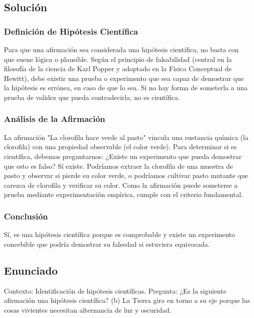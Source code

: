 \documentclass[12pt,letterpaper]{article}
\begin{document}
\subsection*{Solución}

\subsubsection*{Definición de Hipótesis Científica}
Para que una afirmación sea considerada una hipótesis científica, no basta con que suene lógica o plausible. Según el principio de falsabilidad (central en la filosofía de la ciencia de Karl Popper y adoptado en la Física Conceptual de Hewitt), debe existir una prueba o experimento que sea capaz de demostrar que la hipótesis es errónea, en caso de que lo sea. Si no hay forma de someterla a una prueba de validez que pueda contradecirla, no es científica.

\subsubsection*{Análisis de la Afirmación}
La afirmación "La clorofila hace verde al pasto" vincula una sustancia química (la clorofila) con una propiedad observable (el color verde). Para determinar si es científica, debemos preguntarnos: ¿Existe un experimento que pueda demostrar que esto es falso? 
Sí existe. Podríamos extraer la clorofila de una muestra de pasto y observar si pierde su color verde, o podríamos cultivar pasto mutante que carezca de clorofila y verificar su color. Como la afirmación puede someterse a prueba mediante experimentación empírica, cumple con el criterio fundamental.

\subsubsection*{Conclusión}
Sí, es una hipótesis científica porque es comprobable y existe un experimento concebible que podría demostrar su falsedad si estuviera equivocada.

\newpage

\subsection*{Enunciado}
Contexto: Identificación de hipótesis científicas.
Pregunta: ¿Es la siguiente afirmación una hipótesis científica? (b) La Tierra gira en torno a su eje porque las cosas vivientes necesitan alternancia de luz y oscuridad.
\end{document}
